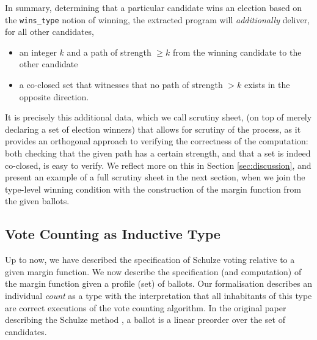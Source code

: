 \label{sec:evidence}
In summary, determining that a particular candidate wins an election
based on the \texttt{wins\_type} notion of winning, the extracted
program will \emph{additionally} deliver, for all other candidates,
\begin{itemize}
\item an integer $k$ and a path of strength $\geq k$ from the winning candidate to the
other candidate 
\item a co-closed set that witnesses that no path of strength $>k$
exists in the opposite direction.
\end{itemize}

\noindent
It is precisely this additional data, which we call scrutiny sheet,
(on top of merely declaring a set of
election winners) that allows for scrutiny of the process, as it
provides an orthogonal approach to verifying the correctness of the
computation: both checking that the given path has a certain
strength, and that a set is indeed co-closed, is easy to verify.
We reflect more on this in Section
\ref{sec:discussion}, and present an example of a full scrutiny
sheet in the next section, when we join the type-level winning
condition with the construction of the margin function from the
given ballots. 

\subsection{Vote Counting as Inductive Type}
\label{sec:inductive_type}
Up to now, we have described the specification of Schulze voting
relative to a given margin function. We now describe the
specification (and computation) of the margin function given a
profile (set) of ballots.  Our formalisation describes an individual
\emph{count} as a type with the interpretation that all inhabitants
of this type are correct executions of the vote counting algorithm.
In the original paper describing the
Schulze method \citep{Schulze:2011:NMC}, a ballot is a linear
preorder over the set of candidates.


